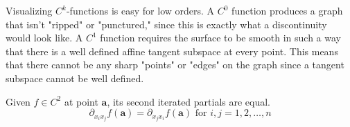   Visualizing $C^k$-functions is easy for low orders. A $C^0$ function produces a graph that isn't "ripped" or "punctured," since this is exactly what a discontinuity would look like. A $C^1$ function requires the surface to be smooth in such a way that there is a well defined affine tangent subspace at every point. This means that there cannot be any sharp "points" or "edges" on the graph since a tangent subspace cannot be well defined. 

  \begin{theorem}
    Given $f \in C^2$ at point $\mathbf{a}$, its second iterated partials are equal. 
    \begin{equation}
      \partial_{x_i x_j} f (\mathbf{a})= \partial_{x_j x_i} f (\mathbf{a})\text{ for } i, j = 1, 2, \ldots, n
    \end{equation}
  \end{theorem}
